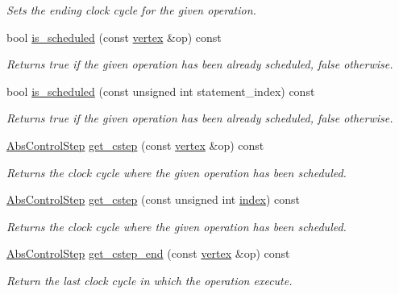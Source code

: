 \begin{DoxyCompactItemize}
\begin{DoxyCompactList}\small\item\em Sets the ending clock cycle for the given operation. \end{DoxyCompactList}\item 
bool \hyperlink{classSchedule_adeef437f5a2674165df77031551f4f48}{is\+\_\+scheduled} (const \hyperlink{graph_8hpp_abefdcf0544e601805af44eca032cca14}{vertex} \&op) const
\begin{DoxyCompactList}\small\item\em Returns true if the given operation has been already scheduled, false otherwise. \end{DoxyCompactList}\item 
bool \hyperlink{classSchedule_a67b5a4dd9ac6f111299d0bcb014f20a0}{is\+\_\+scheduled} (const unsigned int statement\+\_\+index) const
\begin{DoxyCompactList}\small\item\em Returns true if the given operation has been already scheduled, false otherwise. \end{DoxyCompactList}\item 
\hyperlink{structAbsControlStep}{Abs\+Control\+Step} \hyperlink{classSchedule_a7b6c9b65b093277adc5fa53e8b10f551}{get\+\_\+cstep} (const \hyperlink{graph_8hpp_abefdcf0544e601805af44eca032cca14}{vertex} \&op) const
\begin{DoxyCompactList}\small\item\em Returns the clock cycle where the given operation has been scheduled. \end{DoxyCompactList}\item 
\hyperlink{structAbsControlStep}{Abs\+Control\+Step} \hyperlink{classSchedule_a9899b55e9cb1322b52e3c93bc4d27a70}{get\+\_\+cstep} (const unsigned int \hyperlink{tutorial__pact__2019_2Introduction_2third_2include_2Keccak_8h_a028c9bdc8344cca38ab522a337074797}{index}) const
\begin{DoxyCompactList}\small\item\em Returns the clock cycle where the given operation has been scheduled. \end{DoxyCompactList}\item 
\hyperlink{structAbsControlStep}{Abs\+Control\+Step} \hyperlink{classSchedule_ae37f5691291fd1656e4704c59ded9249}{get\+\_\+cstep\+\_\+end} (const \hyperlink{graph_8hpp_abefdcf0544e601805af44eca032cca14}{vertex} \&op) const
\begin{DoxyCompactList}\small\item\em Return the last clock cycle in which the operation execute. \end{DoxyCompactList}\item 

\end{DoxyCompactItemize}
